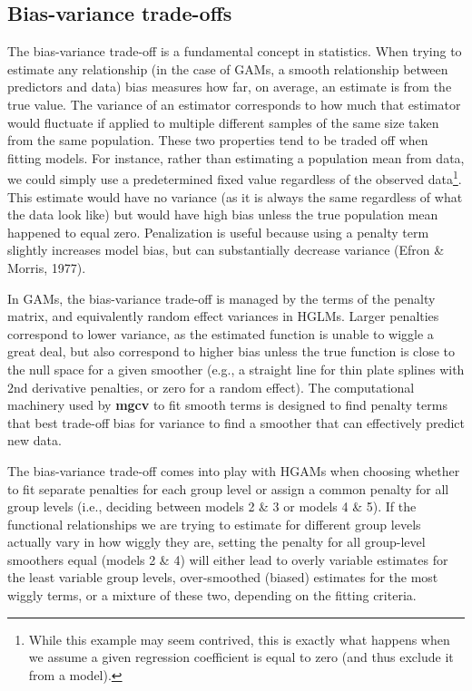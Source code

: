 \documentclass[12pt]{article}
\let\rmarkdownfootnote\footnote%
\def\footnote{\protect\rmarkdownfootnote}
\begin{document}
\subsection{Bias-variance trade-offs}\label{bias-variance-trade-offs}

The bias-variance trade-off is a fundamental concept in statistics. When
trying to estimate any relationship (in the case of GAMs, a smooth
relationship between predictors and data) bias measures how far, on
average, an estimate is from the true value. The variance of an
estimator corresponds to how much that estimator would fluctuate if
applied to multiple different samples of the same size taken from the
same population. These two properties tend to be traded off when fitting
models. For instance, rather than estimating a population mean from
data, we could simply use a predetermined fixed value regardless of the
observed data\footnote{While this example may seem contrived, this is
  exactly what happens when we assume a given regression coefficient is
  equal to zero (and thus exclude it from a model).}. This estimate
would have no variance (as it is always the same regardless of what the
data look like) but would have high bias unless the true population mean
happened to equal zero. Penalization is useful because using a penalty
term slightly increases model bias, but can substantially decrease
variance (Efron \& Morris, 1977).

In GAMs, the bias-variance trade-off is managed by the terms of the
penalty matrix, and equivalently random effect variances in HGLMs.
Larger penalties correspond to lower variance, as the estimated function
is unable to wiggle a great deal, but also correspond to higher bias
unless the true function is close to the null space for a given smoother
(e.g., a straight line for thin plate splines with 2nd derivative
penalties, or zero for a random effect). The computational machinery
used by \textbf{mgcv} to fit smooth terms is designed to find penalty
terms that best trade-off bias for variance to find a smoother that can
effectively predict new data.

The bias-variance trade-off comes into play with HGAMs when choosing
whether to fit separate penalties for each group level or assign a
common penalty for all group levels (i.e., deciding between models 2 \&
3 or models 4 \& 5). If the functional relationships we are trying to
estimate for different group levels actually vary in how wiggly they
are, setting the penalty for all group-level smoothers equal (models 2
\& 4) will either lead to overly variable estimates for the least
variable group levels, over-smoothed (biased) estimates for the most
wiggly terms, or a mixture of these two, depending on the fitting
criteria.
\end{document}
